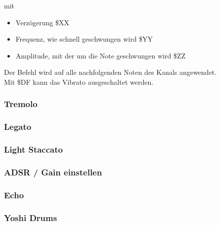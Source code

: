\medskip



\medskip

mit

\begin{itemize}
	\item Verzögerung \$XX
	\item Frequenz, wie schnell geschwungen wird \$YY
	\item Amplitude, mit der um die Note geschwungen wird \$ZZ
\end{itemize}

Der Befehl wird auf alle nachfolgenden Noten des Kanals angewendet. \\
Mit \$DF kann das Vibrato ausgeschaltet werden.


\subsubsection{Tremolo}
\subsubsection{Legato}
\subsubsection{Light Staccato}
\subsubsection{ADSR / Gain einstellen}
\subsubsection{Echo}
\subsubsection{Yoshi Drums}
